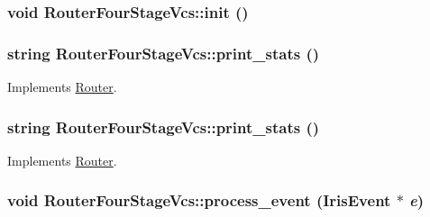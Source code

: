 \hypertarget{classRouterFourStageVcs_203c41c81023398f78d90731b6fa3299}{
\subsubsection[{init}]{\setlength{\rightskip}{0pt plus 5cm}void RouterFourStageVcs::init ()}}
\label{classRouterFourStageVcs_203c41c81023398f78d90731b6fa3299}


\hypertarget{classRouterFourStageVcs_22248991584f945954ef5f520b786c15}{
\subsubsection[{print\_\-stats}]{\setlength{\rightskip}{0pt plus 5cm}string RouterFourStageVcs::print\_\-stats ()}}
\label{classRouterFourStageVcs_22248991584f945954ef5f520b786c15}




Implements \hyperlink{classRouter_75995624d8bd533a9d3eb8c06a62ce07}{Router}.\hypertarget{classRouterFourStageVcs_22248991584f945954ef5f520b786c15}{
\subsubsection[{print\_\-stats}]{\setlength{\rightskip}{0pt plus 5cm}string RouterFourStageVcs::print\_\-stats ()}}
\label{classRouterFourStageVcs_22248991584f945954ef5f520b786c15}




Implements \hyperlink{classRouter_75995624d8bd533a9d3eb8c06a62ce07}{Router}.\hypertarget{classRouterFourStageVcs_81562fa747c216e200476ab1f85699bf}{
\subsubsection[{process\_\-event}]{\setlength{\rightskip}{0pt plus 5cm}void RouterFourStageVcs::process\_\-event ({\bf IrisEvent} $\ast$ {\em e})}}
\label{classRouterFourStageVcs_81562fa747c216e200476ab1f85699bf}




